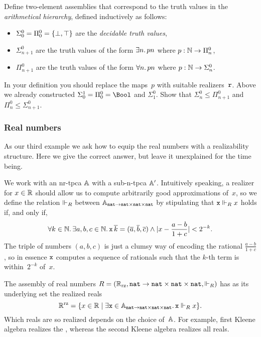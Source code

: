\begin{exercise}
  Define two-element assemblies that correspond to the truth values in the \emph{arithmetical hierarchy}, defined inductively as follows:
  \begin{itemize}
  \item $\Sigma^0_0 = \Pi^0_0 = \set{\bot, \top}$ are the \emph{decidable truth values},
  \item $\Sigma^0_{n+1}$ are the truth values of the form $\some{n} p n$ where $p : \NN \to \Pi^0_n$,
  \item $\Pi^0_{n+1}$ are the truth values of the form $\all{n} p n$ where $p : \NN \to \Sigma^0_n$.
  \end{itemize}
  In your definition you should replace the maps~$p$ with suitable realizers~$\R{r}$.
  Above we already constructed $\Sigma_0^1 = \Pi^0_0 = \Bool$ and $\Sigma^0_1$. Show that $\Sigma^0_n \leq \Pi^0_{n+1}$ and $\Pi^0_n \leq \Sigma^0_{n+1}$.
\end{exercise}


\subsubsection{Real numbers}
\label{sec:asm-real-numbers}

As our third example we ask how to equip the real numbers with a realizability structure. Here we give the correct answer, but leave it unexplained for the time being.

We work with an nr-tpca $\AA$ with a sub-n-tpca $\subAA$. Intuitively speaking, a realizer for $x \in \RR$ should allow us to compute arbitrarily good approximations of~$x$, so we define the relation $\rz[R]$ between $\Atyp{\ttnat \to \ttnat \times \ttnat \times \ttnat}$ by stipulating that $\R{x} \rz[R] x$ holds if, and only if,
%
\begin{equation*}
  \all{k \in \NN} \some{a, b, c \in \NN}
  \R{x} \, \overline{k} = (\overline{a}, \overline{b}, \overline{c})
  \land |x - \frac{a - b}{1 + c}| < 2^{-k}.
\end{equation*}
%
The triple of numbers $(a, b, c)$ is just a clumsy way of encoding the rational $\frac{a - b}{1 + c}$, so in essence $\R{x}$ computes a sequence of rationals such that the $k$-th term is within~$2^{-k}$ of~$x$.

The assembly of real numbers $R = (\RR_{\mathrm{rz}}, \ttnat \to \ttnat \times \ttnat \times \ttnat, {\rz[R]})$ has as its underlying set the realized reals
%
\begin{equation*}
  \RR^{\mathrm{rz}}
  = \set{x \in \RR \such \some{\R{x} \in \Atyp{\ttnat \to \ttnat \times \ttnat \times \ttnat}} \R{x} \rz[R] x}.
\end{equation*}
%
Which reals are so realized depends on the choice of~$\AA$. For example, first Kleene algebra realizes the , whereas the second Kleene algebra realizes all reals.

